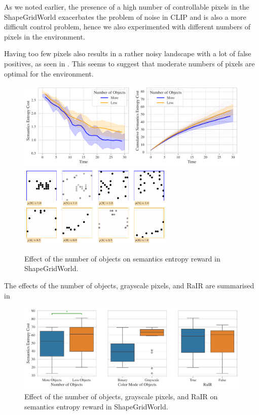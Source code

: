 As we noted earlier, the presence of a high number of controllable pixels in the ShapeGridWorld exacerbates the problem of noise in CLIP and is also a more difficult control problem, hence we also experimented with different numbers of pixels in the environment.

Having too few pixels also results in a rather noisy landscape with a lot of false positives, as seen in .
This seems to suggest that moderate numbers of pixels are optimal for the environment.

\begin{figure}[h]
    \centering
    \includegraphics[width=\textwidth]{images/n_objects_comparison_sgw.pdf}
    \vspace{12pt}
    \includegraphics[width=0.66\textwidth]{images/n_objects_samples_sgw.pdf}
    \caption{Effect of the number of objects on semantics entropy reward in ShapeGridWorld.}
    \label{fig:n-objects-sgw}
\end{figure}

The effects of the number of objects, grayscale pixels, and RaIR are summarised in 
\begin{figure}[h]
    \centering
    \includegraphics[width=\textwidth]{images/nobj_mode_rair_sgw_boxplot.pdf}
    \caption{Effect of the number of objects, grayscale pixels, and RaIR on semantics entropy reward in ShapeGridWorld.}
    \label{fig:nobj-mode-sgw}
\end{figure}

